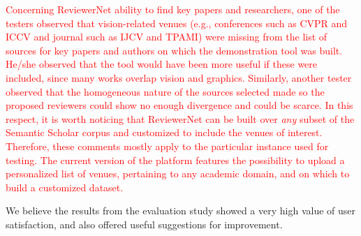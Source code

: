 \textcolor{red}{Concerning ReviewerNet ability to find key papers and researchers, one of the testers observed that vision-related venues (e.g., conferences such as CVPR and ICCV and journal such as IJCV and TPAMI) were missing from the list of sources for key papers and authors on which the demonstration tool was built. He/she observed that the tool would have been more useful if these were included, since many works overlap vision and graphics. Similarly, another tester observed that the homogeneous nature of the sources selected made so the proposed reviewers could show no enough divergence and could be scarce. In this respect, it is worth noticing that ReviewerNet can be built over \emph{any} subset of the Semantic Scholar corpus and customized to include the venues of interest. Therefore, these comments mostly apply to the particular instance used for testing. The current version of the platform features the possibility to upload a personalized list of venues, pertaining to any academic domain, and on which to build a customized dataset. %
}

We believe the results from the evaluation study showed a very high value of user satisfaction, and also offered useful suggestions for improvement.




  




   

      